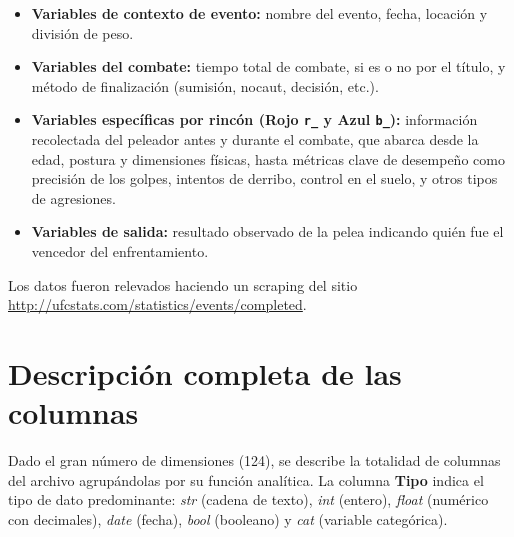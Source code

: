 \documentclass[11pt,a4paper]{article}
\begin{document}
\begin{itemize}[leftmargin=*]
	\item \textbf{Variables de contexto de evento:} nombre del evento, fecha, locación y división de peso.
	\item \textbf{Variables del combate:} tiempo total de combate, si es o no por el título, y método de finalización (sumisión, nocaut, decisión, etc.).
	\item \textbf{Variables específicas por rincón (Rojo \texttt{r\_} y Azul \texttt{b\_}):} información recolectada del peleador antes y durante el combate, que abarca desde la edad, postura y dimensiones físicas, hasta métricas clave de desempeño como precisión de los golpes, intentos de derribo, control en el suelo, y otros tipos de agresiones.
	\item \textbf{Variables de salida:} resultado observado de la pelea indicando quién fue el vencedor del enfrentamiento.
\end{itemize}

Los datos fueron relevados haciendo un scraping del sitio \url{http://ufcstats.com/statistics/events/completed}.

\pagebreak
\section{Descripción completa de las columnas}

Dado el gran número de dimensiones (124), se describe la totalidad de columnas del archivo  agrupándolas por su función analítica. La columna \textbf{Tipo} indica el tipo de dato predominante: \textit{str} (cadena de texto), \textit{int} (entero), \textit{float} (numérico con decimales), \textit{date} (fecha), \textit{bool} (booleano) y \textit{cat} (variable categórica).
\end{document}
